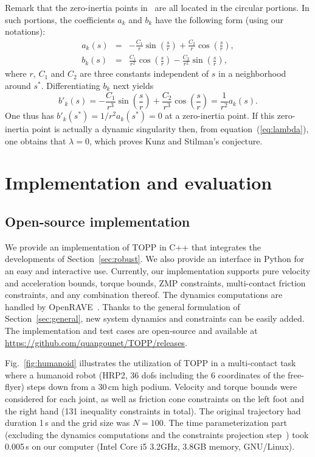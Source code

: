 \documentclass[9pt,technote]{IEEEtran}
\begin{document}
Remark  that the zero-inertia points in~\cite{KS12rss} are all
located in the circular portions. In such portions, the coefficients
$a_k$ and $b_k$ have the following form (using our notations):
%
{\begin{eqnarray}
  \label{eq:toto}
  a_k(s)&=&-\frac{C_1}{r} \sin\left(\frac{s}{r}\right)+\frac{C_2}{r} \cos\left(\frac{s}{r}\right),\nonumber\\
  b_k(s)&=&\frac{C_1}{r^2} \cos\left(\frac{s}{r}\right)-\frac{C_2}{r^2} \sin\left(\frac{s}{r}\right),\nonumber
\end{eqnarray}}
where $r$, $C_1$ and $C_2$ are three constants independent of $s$ in a
neighborhood around $s^*$.
Differentiating $b_k$ next yields
{
\[
b'_k(s)=-\frac{C_1}{r^3} \sin\left(\frac{s}{r}\right)+\frac{C_2}{r^3} \cos\left(\frac{s}{r}\right)=\frac{1}{r^2} a_k(s).
\]}
%
One thus has $b'_k(s^*)=1/r^2a_k(s^*)=0$ at a zero-inertia point. If
this zero-inertia point is actually a dynamic singularity then, from
equation~(\ref{eq:lambda}), one obtains that $\lambda=0$, which proves
Kunz and Stilman's conjecture.


\section{Implementation and evaluation}
\label{sec:implementation}

\subsection{Open-source implementation}

We provide an implementation of TOPP in C++ that integrates the
developments of Section~\ref{sec:robust}.  We also provide an
interface in Python for an easy and interactive use. Currently, our
implementation supports pure velocity and acceleration bounds, torque
bounds, ZMP constraints, multi-contact friction constraints, and any
combination thereof. The dynamics computations are handled by
OpenRAVE~\cite{Dia10these}. Thanks to the general formulation of
Section~\ref{sec:general}, new system dynamics and constraints can be
easily added. The implementation and test cases are open-source and
available at \url{https://github.com/quangounet/TOPP/releases}.

Fig.~\ref{fig:humanoid} illustrates the utilization of TOPP in a
multi-contact task where a humanoid robot (HRP2, 36 dofs including the
6 coordinates of the free-flyer) steps down from a 30\,cm high
podium. Velocity and torque bounds were considered for each joint, as
well as friction cone constraints on the left foot and the right hand
(131 inequality constraints in total). The original trajectory had
duration 1\,s and the grid size was $N=100$. The time parameterization
part (excluding the dynamics computations and the constraints
projection step~\cite{Hau14icra}) took 0.005\,s on our computer (Intel
Core i5 3.2GHz, 3.8GB memory, GNU/Linux).
\end{document}
